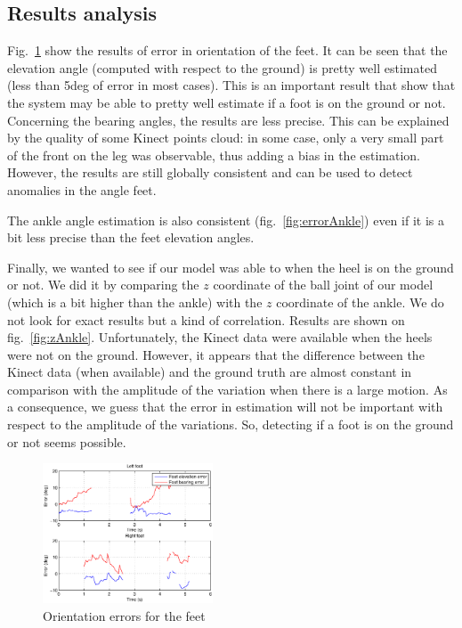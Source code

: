 \documentclass[letterpaper, 10 pt, conference]{ieeeconf}
\begin{document}
\subsection{Results analysis}

Fig.~\ref{fig:footError} show the results of error in orientation of the feet. It can be seen that the elevation angle (computed with respect to the ground) is pretty well estimated (less than 5deg of error in most cases). This is an important result that show that the system may be able to pretty well estimate if a foot is on the ground or not. Concerning the bearing angles, the results are less precise. This can be explained by the quality of some Kinect points cloud: in some case, only a very small part of the front on the leg was observable, thus adding a bias in the estimation. However, the results are still globally consistent and can be used to detect anomalies in the angle feet.

The ankle angle estimation is also consistent (fig.~\ref{fig:errorAnkle}) even if it is a bit less precise than the feet elevation angles. 

Finally, we wanted to see if our model was able to when the heel is on the ground or not. We did it by comparing the $z$ coordinate of the ball joint of our model (which is a bit higher than the ankle) with the $z$ coordinate of the ankle. We do not look for exact results but a kind of correlation. Results are shown on fig.~\ref{fig:zAnkle}. Unfortunately, the Kinect data were available when the heels were not on the ground. However, it appears that the difference between the Kinect data (when available) and the ground truth are almost constant in comparison with the amplitude of the variation when there is a large motion. As a consequence, we guess that the error in estimation will not be important with respect to the amplitude of the variations. So, detecting if a foot is on the ground or not seems possible.



\begin{figure}
	\centering
	\includegraphics[width=0.45\textwidth]{images/footError}
	\caption{Orientation errors for the feet}
	\label{fig:footError}
\end{figure}
\end{document}
